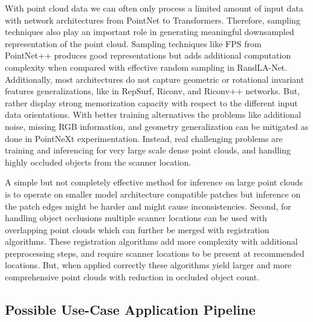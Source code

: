 \documentclass{article}
\begin{document}
With point cloud data we can often only process a limited amount of input data with network architectures from PointNet to Transformers.
Therefore, sampling techniques also play an important role in generating meaningful downsampled representation of the point cloud.
Sampling techniques like FPS from PointNet++ produces good representations but adds additional computation complexity when compared with effective random sampling in RandLA-Net.
Additionally, most architectures do not capture geometric or rotational invariant features generalizations, like in RepSurf, Riconv, and Riconv++ networks.
But, rather display strong memorization capacity with respect to the different input data orientations.
With better training alternatives the problems like additional noise, missing RGB information, and geometry generalization can be mitigated as done in PointNeXt experimentation.
Instead, real challenging problems are training and inferencing for very large scale dense point clouds, and handling highly occluded objects from the scanner location.


A simple but not completely effective method for inference on large point clouds is to operate on smaller model architecture compatible patches but inference on the patch edges might be harder and might cause inconsistencies.
Second, for handling object occlusions multiple scanner locations can be used with overlapping point clouds which can further be merged with registration algorithms.
These registration algorithms add more complexity with additional preprocessing steps, and require scanner locations to be present at recommended locations.
But, when applied correctly these algorithms yield larger and more comprehensive point clouds with reduction in occluded object count.


\subsection{Possible Use-Case Application Pipeline}
\end{document}
